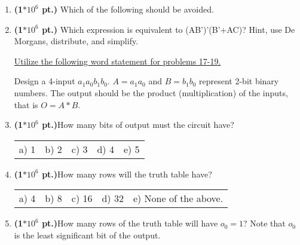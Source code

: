 \documentclass{article}
\begin{document}
\begin{enumerate}
\item {\bf (1$*10^6$ pt.)} Which of the following should be avoided.

\item {\bf (1$*10^6$ pt.)} Which expression is equivalent to (AB')'(B'+AC)?
Hint, use De Morgans, distribute, and simplify.
\pagebreak

\underline{Utilize the following word statement for problems 17-19.}

Design a 4-input $a_1a_0b_1b_0$. $A=a_1a_0$ and $B=b_1b_0$ represent
2-bit binary numbers.  The output should be the product (multiplication)
of the inputs, that is $O=A*B$.

\item {\bf (1$*10^6$ pt.)}How many bits of output must the circuit have?

\begin{tabular}{p{0.7in} p{0.7in} p{0.7in} p{0.7in} l}
a) 1 & b) 2 & c) 3 & d) 4 & e) 5
\end{tabular}

\item {\bf (1$*10^6$ pt.)}How many rows will the truth table have?

\begin{tabular}{p{0.7in} p{0.7in} p{0.7in} p{0.7in} l}
a) 4 & b) 8 & c) 16 & d) 32 & e) None of the above.
\end{tabular}

\item {\bf (1$*10^6$ pt.)}How many rows of the truth table will have $o_0 = 1$?
Note that $o_0$ is the least significant bit of the output.


\end{enumerate}
\end{document}
